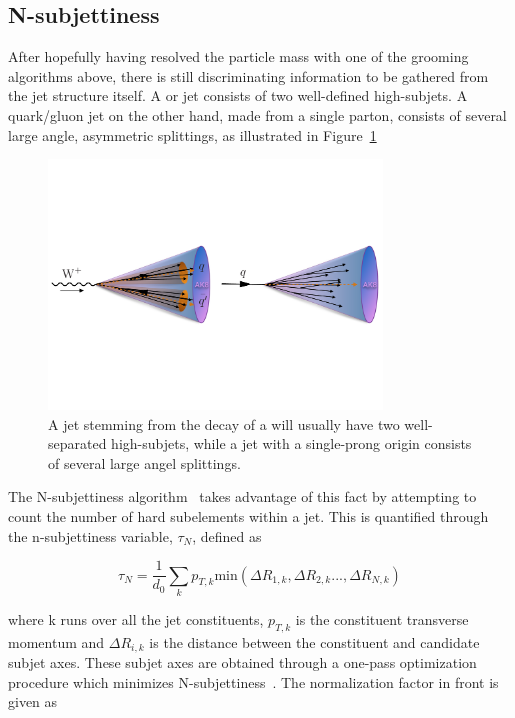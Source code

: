 \subsection{N-subjettiness}
After hopefully having resolved the particle mass with one of the grooming algorithms above, there is still discriminating information to be gathered from the jet structure itself.
A \PW or \PZ jet consists of two well-defined high-\PT subjets. A quark/gluon jet on the other hand, made from a single parton, consists of several large angle, asymmetric splittings, as illustrated in Figure~\ref{fig:objreco:onevstwoprong}

\begin{figure}[ht] 
    \centering 
    \includegraphics[width=0.790\textwidth]{figures/event_reconstruction/tau21_sketch.pdf}
     \caption{A jet stemming from the decay of a \PW will usually have two well-separated high-\pt subjets, while a jet with a single-prong origin consists of several large angel splittings.}
     \label{fig:objreco:onevstwoprong}
 \end{figure}
 
 The N-subjettiness algorithm~\cite{Thaler:2010tr} takes advantage of this fact by attempting to count the number of hard subelements within a jet. This is quantified through the n-subjettiness variable, $\tau_N$, defined as
 

 \begin{equation}
 \tau_N = \frac{1}{d_0} \sum_k p_{T,k}\textrm{min}( \Delta R_{1,k},\Delta R_{2,k}...,\Delta R_{N,k})
 \end{equation} 

where k runs over all the jet constituents, $p_{T,k}$ is the constituent transverse momentum and $\Delta R_{i,k}$ is the distance between the constituent and candidate subjet axes. These subjet axes are obtained through a one-pass optimization procedure which minimizes N-subjettiness~\cite{Thaler2012}. The normalization factor in front is given as

